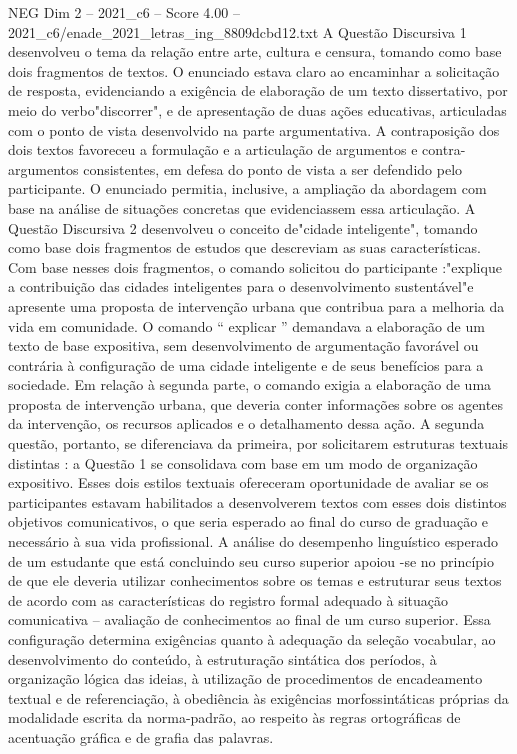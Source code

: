 \begin{textsample}{NEG Dim 2 – 2021\_c6 – Score 4.00 – 2021\_c6/enade\_2021\_letras\_ing\_8809dcbd12.txt}
A Questão Discursiva 1 desenvolveu o tema da relação entre arte, cultura e censura, tomando como base dois fragmentos de textos.
O enunciado estava claro ao encaminhar a solicitação de resposta, evidenciando a exigência de elaboração de um texto dissertativo, por meio do verbo"discorrer", e de apresentação de duas ações educativas, articuladas com o ponto de vista desenvolvido na parte argumentativa.
A contraposição dos dois textos favoreceu a formulação e a articulação de argumentos e contra-argumentos consistentes, em defesa do ponto de vista a ser defendido pelo participante.
O enunciado permitia, inclusive, a ampliação da abordagem com base na análise de situações concretas que evidenciassem essa articulação.
A Questão Discursiva 2 desenvolveu o conceito de"cidade inteligente", tomando como base dois fragmentos de estudos que descreviam as suas características.
Com base nesses dois fragmentos, o comando solicitou do participante :"explique a contribuição das cidades inteligentes para o desenvolvimento sustentável"e apresente uma proposta de intervenção urbana que contribua para a melhoria da vida em comunidade.
O comando “ explicar ” demandava a elaboração de um texto de base expositiva, sem desenvolvimento de argumentação favorável ou contrária à configuração de uma cidade inteligente e de seus benefícios para a sociedade.
Em relação à segunda parte, o comando exigia a elaboração de uma proposta de intervenção urbana, que deveria conter informações sobre os agentes da intervenção, os recursos aplicados e o detalhamento dessa ação.
A segunda questão, portanto, se diferenciava da primeira, por solicitarem estruturas textuais distintas : a Questão 1 se consolidava com base em um modo de organização expositivo.
Esses dois estilos textuais ofereceram oportunidade de avaliar se os participantes estavam habilitados a desenvolverem textos com esses dois distintos objetivos comunicativos, o que seria esperado ao final do curso de graduação e necessário à sua vida profissional.
A análise do desempenho linguístico esperado de um estudante que está concluindo seu curso superior apoiou -se no princípio de que ele deveria utilizar conhecimentos sobre os temas e estruturar seus textos de acordo com as características do registro formal adequado à situação comunicativa – avaliação de conhecimentos ao final de um curso superior.
Essa configuração determina exigências quanto à adequação da seleção vocabular, ao desenvolvimento do conteúdo, à estruturação sintática dos períodos, à organização lógica das ideias, à utilização de procedimentos de encadeamento textual e de referenciação, à obediência às exigências morfossintáticas próprias da modalidade escrita da norma-padrão, ao respeito às regras ortográficas de acentuação gráfica e de grafia das palavras.

\end{textsample}
